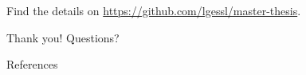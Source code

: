 \documentclass[10pt, aspectratio=169]{beamer}
\begin{document}
\begin{frame}{}
  Find the details on \url{https://github.com/lgessl/master-thesis}.
\end{frame}

\begin{frame}[standout]
      \centering
      Thank you! Questions?
\end{frame}

\appendix

\begin{frame}[allowframebreaks]{References}
  \small
  
\end{frame}
\end{document}
